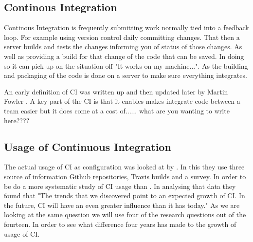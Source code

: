 \documentclass[twoside,12pt,titlepage,a4paper]{article}
\begin{document}
\subsection{Continous Integration}
\vspace*{-0.05in}

Continous Integration is frequently submitting work normally tied into a feedback loop. For example using version control daily committing changes. That then a server builds and tests the changes informing you of status of those changes. As well as providing a build for that change of the code that can be saved. In doing so it can pick up on the situation off "It works on my machine...". As the building and packaging of the code is done on a server to make sure everything integrates.


An early definition of CI was written up and then updated later by Martin Fowler \cite{CI2010_MartinFowler}. A key part of the CI is that it enables makes integrate code between a team easier but it does come at a cost of...... what are you wanting to write here????



\vspace*{-0.05in}
\subsection{Usage of Continuous Integration}
\vspace*{-0.05in}

The actual usage of CI as configuration was looked at by \cite{Hilton2016}. In this they use three source of information Github repositories, Travis builds and a survey. In order to be do a more systematic study of CI usage than \cite{Vasilescu2015}. In analysing that data they found that "The trends that we discovered point to an expected growth of CI. In the future, CI will have an even greater influence than it has today." As we are looking at the same question we will use four of the research questions out of the fourteen. In order to see what difference four years has made to the growth of usage of CI.


\end{document}

